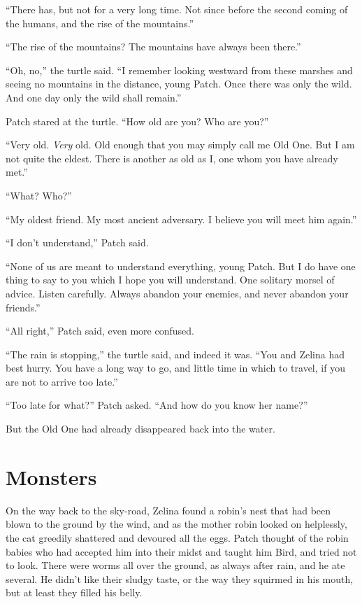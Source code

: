 \documentclass[ebook,oneside,openany,17pt]{memoir}
\newenvironment{tolerant}[1]{%
  \par\tolerance=#1\relax
}{%
  \par
}
\renewcommand{\thechapter}{\Roman{chapter}}
\newcounter{sections}
\newcommand{\sections}[1]{%
  \section*{#1}
  \addtocounter{sections}{1}%
  \pdfbookmark[1]{#1}{section.\thechapter.\thesections}}
\begin{document}
“There has, but not for a very long time. Not since before the second
coming of the humans, and the rise of the mountains.”

“The rise of the mountains? The mountains have always been there.”

“Oh, no,” the turtle said. “I remember looking westward from these
marshes and seeing no mountains in the distance, young Patch. Once
there was only the wild. And one day only the wild shall remain.”

Patch stared at the turtle. “How old are you? Who are you?”

“Very old. \emph{Very} old. Old enough that you may simply call me
Old One. But I am not quite the eldest. There is another as old as I,
one whom you have already met.”

“What? Who?”

“My oldest friend. My most ancient adversary. I believe you will meet
him again.”

“I don’t understand,” Patch said.

\begin{tolerant}{1000}
“None of us are meant to understand everything, young Patch. But I do
have one thing to say to you which I hope you will understand. One
solitary morsel of advice. Listen carefully. Always abandon your
enemies, and never abandon your friends.”
\end{tolerant}

“All right,” Patch said, even more confused.

“The rain is stopping,” the turtle said, and indeed it was. “You and
Zelina had best hurry. You have a long way to go, and little time in
which to travel, if you are not to arrive too late.”

“Too late for what?” Patch asked. “And how do you know her name?”

But the Old One had already disappeared back into the water.


\sections{Monsters}

On the way back to the sky-road, Zelina found a robin’s nest that had
been blown to the ground by the wind, and as the mother robin looked
on helplessly, the cat greedily shattered and devoured all the
eggs. Patch thought of the robin babies who had accepted him into
their midst and taught him Bird, and tried not to look. There were
worms all over the ground, as always after rain, and he ate
several. He didn’t like their sludgy taste, or the way they squirmed
in his mouth, but at least they filled his belly.
\end{document}
